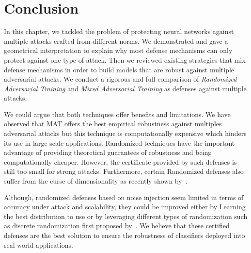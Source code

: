 \section{Conclusion}
\label{section:ap4-conclusion}

In this chapter, we tackled the problem of protecting neural networks against multiple attacks crafted from different norms.
We demonstrated and gave a geometrical interpretation to explain why most defense mechanisms can only protect against one type of attack.
Then we reviewed existing strategies that mix defense mechanisms in order to build models that are robust against multiple adversarial attacks.
We conduct a rigorous and full comparison of \emph{Randomized Adversarial Training} and \emph{Mixed Adversarial Training} as defenses against multiple attacks.

We could argue that both techniques offer benefits and limitations.
We have observed that MAT offers the best empirical robustness against multiples adversarial attacks but this technique is computationally expensive which hinders its use in large-scale applications.
Randomized techniques have the important advantage of providing theoretical guarantees of robustness and being computationally cheaper.
However, the certificate provided by such defenses is still too small for strong attacks.
Furthermore, certain Randomized defenses also suffer from the curse of dimensionality as recently shown by~\citet{kumar2020curse}. 

Although, randomized defenses based on noise injection seem limited in terms of accuracy under attack and scalability, they could be improved either by Learning the best distribution to use or by leveraging different types of randomization such as discrete randomization first proposed by~\citet{pinot2020randomization}.
We believe that these certified defenses are the best solution to ensure the robustness of classifiers deployed into real-world applications.

